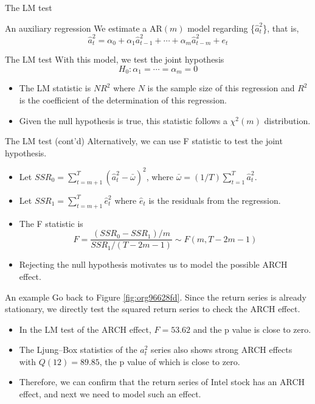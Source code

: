 \documentclass[presentation,10pt]{beamer}
\begin{document}
\begin{frame}[label={sec:org9de398f}]{The LM test}
\begin{block}{An auxiliary regression}
We estimate a AR\((m)\) model regarding \{\(\hat{a}^2_t\)\}, that is,
\[ \hat{a}^2_t = \alpha_0 + \alpha_1 \hat{a}_{t-1}^2 + \cdots +
\alpha_m \hat{a}^2_{t-m} + e_t \]
\end{block}

\begin{block}{The LM test}
With this model, we test the joint hypothesis
\[H_0: \alpha_1 = \cdots = \alpha_m = 0 \]
\begin{itemize}
\item The LM statistic is \(NR^2\) where \(N\) is the sample size of this
regression and \(R^2\) is the coefficient of the determination of this
regression.
\item Given the null hypothesis is true, this statistic follows
a \(\chi^2(m)\) distribution.
\end{itemize}
\end{block}
\end{frame}

\begin{frame}[label={sec:orgad73270}]{The LM test (cont'd)}
Alternatively, we can use F statistic to test the joint
hypothesis. 
\begin{itemize}
\item Let \(SSR_0 = \sum_{t=m+1}^{T} (\hat{a}^2_{t} -
  \bar{\omega})^2\), where \(\bar{\omega} = (1/T) \sum_{t=1}^T
  \hat{a}^2_t\).
\item Let \(SSR_1 = \sum_{t=m+1}^T \hat{e}^2_t\) where \(\hat{e}_t\) is the
residuals from the regression.
\item The F statistic is
\[F = \frac{(SSR_0 - SSR_1)/m}{SSR_1/(T-2m-1)} \sim F(m, T-2m-1)\]
\item Rejecting the null hypothesis motivates us to model the possible
ARCH effect.
\end{itemize}
\end{frame}

\begin{frame}[label={sec:orgfa8cb6e}]{An example}
Go back to Figure \ref{fig:org96628fd}. Since the return series is
already stationary, we directly test the squared return series to
check the ARCH effect. 

\begin{itemize}
\item In the LM test of the ARCH effect, \(F = 53.62\) and the p value is
close to zero.
\item The Ljung–Box statistics of the \(a^2_t\) series also
shows strong ARCH effects with \(Q(12) = 89.85\), the p value of which is
close to zero.
\item Therefore, we can confirm that the return series of
Intel stock has an ARCH effect, and next we need to model such an
effect.
\end{itemize}
\end{frame}
\end{document}
